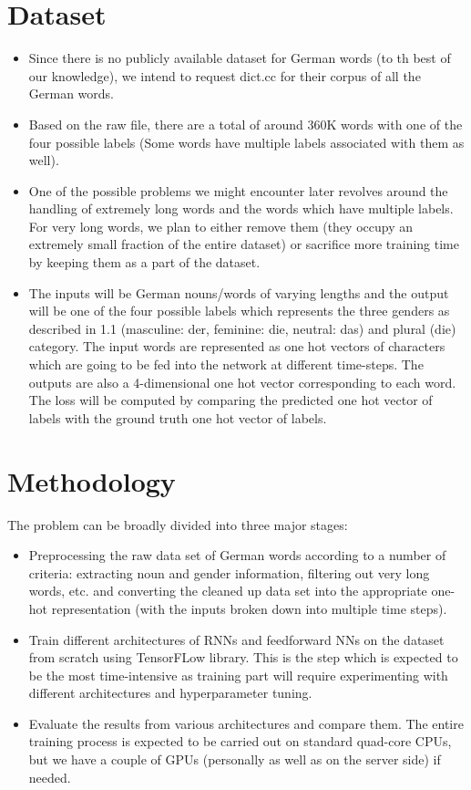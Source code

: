 \documentclass[10pt,twocolumn,letterpaper]{article}
\begin{document}
\section{Dataset}
    \begin{itemize}
        \item Since there is no publicly available dataset for German words (to th best of our knowledge), we intend to request dict.cc for their corpus of all the German words.
        \item Based on the raw file, there are a total of around 360K words with one of the four possible labels (Some words have multiple labels associated with them as well).
        \item One of the possible problems we might encounter later revolves around the handling of extremely long words and the words which have multiple labels. For very long words, we plan to either remove them (they occupy an extremely small fraction of the entire dataset) or sacrifice more training time by keeping them as a part of the dataset.
        \item The inputs will be German nouns/words of varying lengths and the output will be one of the four possible labels which represents the three genders as described in 1.1 (masculine: der, feminine: die, neutral: das) and plural (die) category. The input words are represented as one hot vectors of characters which are going to be fed into the network at different time-steps. The outputs are also a 4-dimensional one hot vector corresponding to each word. The loss will be computed by comparing the predicted one hot vector of labels with the ground truth one hot vector of labels.
    \end{itemize}

\section{Methodology}
    The problem can be broadly divided into three major stages:
    \begin{itemize}
        \item Preprocessing the raw data set of German words according to a number of criteria: extracting noun and gender information, filtering out very long words, etc. and converting the cleaned up data set into the appropriate one-hot representation (with the inputs broken down into multiple time steps).
        \item Train different architectures of RNNs and feedforward NNs on the dataset from scratch using TensorFLow library. This is the step which is expected to be the most time-intensive as training part will require experimenting with different architectures and hyperparameter tuning.
        \item Evaluate the results from various architectures and compare them.
        The entire training process is expected to be carried out on standard quad-core CPUs, but we have a couple of GPUs (personally as well as on the server side) if needed.
    \end{itemize}
\end{document}
